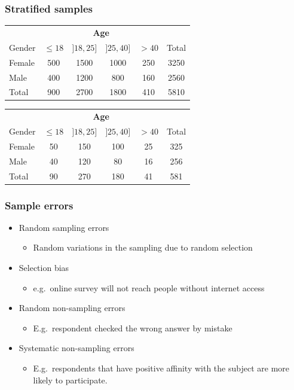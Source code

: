 \documentclass{beamer}
\begin{document}
\begin{frame}
  \frametitle{Stratified samples}

  \begin{center}
    \begin{tabular}{l|cccc|c}
      & \multicolumn{4}{c|}{\textbf{Age}} & \\
      Gender & $\le 18$ & $]18,25]$ & $]25, 40]$ & $> 40$ & Total\\
      \hline
      Female & 500 & 1500 & 1000 & 250 & 3250 \\
      Male   & 400 & 1200 & 800 & 160 & 2560\\
      \hline
      Total  & 900 & 2700 & 1800 & 410 & 5810
    \end{tabular}

    \vspace{1cm}

    \pause
    \begin{tabular}{l|cccc|c}
      & \multicolumn{4}{c|}{\textbf{Age}} & \\
      Gender & $\le 18$ & $]18,25]$ & $]25, 40]$ & $> 40$ & Total\\
      \hline
      Female & 50 & 150 & 100 & 25 & 325 \\
      Male   & 40 & 120 & 80 & 16 & 256\\
      \hline
      Total & 90 & 270 & 180 & 41 & 581
    \end{tabular}

  \end{center}
\end{frame}

\begin{frame}
  \frametitle{Sample errors}

  \begin{itemize}
    \item<+-> Random sampling errors
      \begin{itemize}
        \item Random variations in the sampling due to random selection
      \end{itemize}
    \item<+-> Selection bias
      \begin{itemize}
        \item e.g.~online survey will not reach people without internet access
      \end{itemize}
    \item<+-> Random non-sampling errors
      \begin{itemize}
        \item E.g.~respondent checked the wrong answer by mistake
      \end{itemize}
    \item<+-> Systematic non-sampling errors
      \begin{itemize}
        \item E.g.~respondents that have positive affinity with the subject are more likely to participate.
      \end{itemize}
  \end{itemize}
\end{frame}
\end{document}
